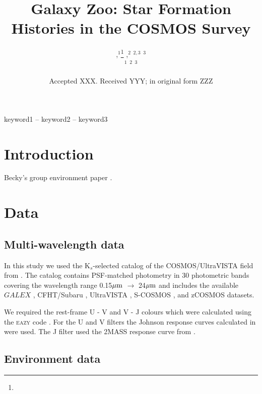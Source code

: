 \documentclass[a4paper,fleqn,usenatbib]{mnras}
\title[COSMOS SFHs]{Galaxy Zoo: Star Formation Histories in the COSMOS Survey}
\author[]{
,$^{1}$\thanks{}
,$^{2}$
$^{2,3}$
$^{3}$
\\
$^{1}$
$^{2}$
$^{3}$
}
\date{Accepted XXX. Received YYY; in original form ZZZ}
\begin{document}
\label{firstpage}
\pagerange{\pageref{firstpage}--\pageref{lastpage}}
\maketitle

\begin{abstract}


\end{abstract}

\begin{keywords}
keyword1 -- keyword2 -- keyword3
\end{keywords}



\section{Introduction}
Becky's group environment paper \cite{smethurst2017galaxy}.
\section{Data}
   
   \subsection{Multi-wavelength data}
   
   In this study we used the K$_{s}$-selected catalog of the COSMOS/UltraVISTA field from \cite{muzzin2013public}.  
   The catalog contains PSF-matched photometry in 30 photometric bands covering the wavelength range 0.15$\hbox{$\mu$m}$ 
   $\rightarrow$ 24$\hbox{$\mu$m}$ and includes the available $GALEX$ \citep{martin2005}, CFHT/Subaru \citep{capak2007}, 
   UltraVISTA \citep{mcCraken2012}, S-COSMOS \citep{sanders2007}, and zCOSMOS \citep{lilly2009} datasets.

   We required the rest-frame U - V and V - J colours which were calculated using the \textsc{eazy} code 
   \citep{eazycode}. For the U and V filters the Johnson response curves calculated in \cite{maiz2006} 
   were used. The J filter used the 2MASS response curve from \cite{2mass2006}.
 
   \subsection{Environment data}
  
\end{document}
